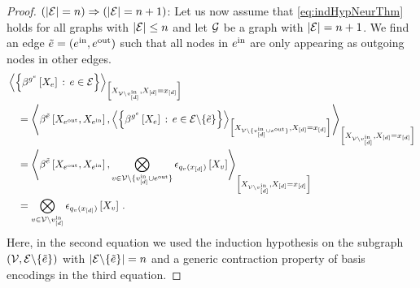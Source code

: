 \begin{proof}
    $(\left|\mathcal{E}\right|=n)\Rightarrow(\left|\mathcal{E}\right|=n+1)$:
    Let us now assume that \eqref{eq:indHypNeurThm} holds for all graphs with $\left|\mathcal{E}\right|\leq n$ and let $\mathcal{G}$ be a graph with $\left|\mathcal{E}\right|=n+1$.
    We find an edge $\tilde{e}=(e^{\mathrm{in}},e^{\mathrm{out}})$ such that all nodes in $e^{\mathrm{in}}$ are only appearing as outgoing nodes in other edges.
    \begin{align*}
        &\contractionof{\left\{\bencodingofat{\secexfunctionof{\edge}}{\catvariableof{\edge}} \wcols \edge\in\edges\right\}
        }{\catvariableof{\nodes\setexcept{\node^{\insymbol}_{[\atomorder]}}},\indexedshortcatvariables} \\
        &\quad=
        \contractionof{
            \bencodingofat{\secedge}{\catvariableof{\outgoingnodes},\catvariableof{\incomingnodes}},
            \contractionof{\left\{\bencodingofat{\secexfunctionof{\edge}}{\catvariableof{\edge}} \wcols \edge\in\edges\setexcept{\{\secedge\}}\right\}
            }{\catvariableof{\nodes\setexcept{\{\node^{\insymbol}_{[\atomorder]}\cup\outgoingnodes\}}},\indexedshortcatvariables}
        }{\catvariableof{\nodes\setexcept{\node^{\insymbol}_{[\atomorder]}}},\indexedshortcatvariables} \\
        &\quad=
        \contractionof{
            \bencodingofat{\secedge}{\catvariableof{\outgoingnodes},\catvariableof{\incomingnodes}},
            \bigotimes_{\node\in\nodes\setexcept{\{\node^{\insymbol}_{[\atomorder]}\cup\outgoingnodes\}}}
            \onehotmapofat{\exfunctionof{\node}(\shortcatindices)}{\catvariableof{\node}}
        }{\catvariableof{\nodes\setexcept{\node^{\insymbol}_{[\atomorder]}}},\indexedshortcatvariables} \\
        &\quad=
        \bigotimes_{\node\in\nodes\setexcept{\node^{\insymbol}_{[\atomorder]}}}
        \onehotmapofat{\exfunctionof{\node}(\shortcatindices)}{\catvariableof{\node}} \, .
    \end{align*}
    Here, in the second equation we used the induction hypothesis on the subgraph $(\mathcal{V},\mathcal{E}\backslash\{\tilde{e}\})$ with $\left|\mathcal{E}\backslash\{\tilde{e}\}\right|=n$ and a generic contraction property of basis encodings in the third equation.


\end{proof}
